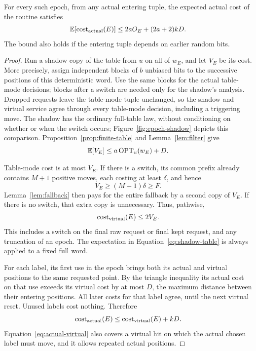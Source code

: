 \begin{lemma}\label{lem:epoch-comparison}
For every such epoch, from any actual entering tuple, the expected actual
cost of the routine satisfies
\begin{equation}\label{eq:epoch-cost}
 \mathbb E[\operatorname{cost}_{\rm actual}(E)]
 \le 2aO_E+(2a+2)kD.
\end{equation}
The bound also holds if the entering tuple depends on earlier random bits.
\end{lemma}

\begin{proof}
Run a shadow copy of the table from $u$ on all of $w_E$, and let $V_E$
be its cost.  More precisely, assign independent blocks of $b$ unbiased
bits to the successive positions of this deterministic word.  Use the
same blocks for the actual table-mode decisions; blocks after a switch
are needed only for the shadow's analysis.  Dropped requests leave the
table-mode tuple unchanged, so the shadow and virtual service agree
through every table-mode decision, including a triggering move.
The shadow has the ordinary full-table law, without conditioning on
whether or when the switch occurs; Figure~\ref{fig:epoch-shadow} depicts
this comparison. Proposition~\ref{prop:finite-table}
and Lemma~\ref{lem:filter} give
\begin{equation}\label{eq:shadow-table}
 \mathbb E[V_E]\le a\operatorname{OPT}_u(w_E)+D.
\end{equation}

Table-mode cost is at most $V_E$.  If there is a switch, its common
prefix already contains $M+1$ positive moves, each costing at least
$\delta$, and hence
\[
 V_E\ge (M+1)\delta\ge F.
\]
Lemma~\ref{lem:fallback} then pays for the entire fallback by a second
copy of $V_E$.  If there is no switch, that extra copy is unnecessary.
Thus, pathwise,
\begin{equation}\label{eq:virtual-shadow}
 \operatorname{cost}_{\rm virtual}(E)\le 2V_E.
\end{equation}
This includes a switch on the final raw request or final kept request,
and any truncation of an epoch.  The expectation in
Equation~\eqref{eq:shadow-table} is always applied to a fixed full word.

For each label, its first use in the epoch brings both its actual and
virtual positions to the same requested point.  By the triangle
inequality its actual cost on that use exceeds its virtual cost by at
most $D$, the maximum distance between their entering positions.  All
later costs for that label agree, until the next virtual reset.  Unused
labels cost nothing.  Therefore
\begin{equation}\label{eq:actual-virtual}
 \operatorname{cost}_{\rm actual}(E)
 \le \operatorname{cost}_{\rm virtual}(E)+kD.
\end{equation}
Equation~\eqref{eq:actual-virtual} also covers a virtual hit on which the actual chosen label must
move, and it allows repeated actual positions.


\end{proof}
